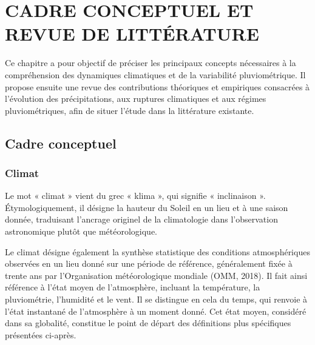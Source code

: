 
\newcommand{\concept}[1]{%
  \par\medskip\noindent
  \professionalbullet\hspace{0.65em}%
  {\color{navyblue}\bfseries #1}%
  \par\nobreak\smallskip
}

\chapter{CADRE CONCEPTUEL ET REVUE DE LITTÉRATURE}

\begin{chapterintro}
\begin{justify}
Ce chapitre a pour objectif de préciser les principaux concepts nécessaires à la compréhension des dynamiques climatiques et de la variabilité pluviométrique. Il propose ensuite une revue des contributions théoriques et empiriques consacrées à l'évolution des précipitations, aux ruptures climatiques et aux régimes pluviométriques, afin de situer l'étude dans la littérature existante.
\end{justify}
\end{chapterintro}

\vspace{0.45cm}
\noindent{\color{navyblue}\rule{\textwidth}{1.1pt}}
\vspace{0.35cm}

\section{Cadre conceptuel}

\subsection{Climat}

Le mot « climat » vient du grec « klima », qui signifie « inclinaison ». Étymologiquement, il désigne la hauteur du Soleil en un lieu et à une saison donnée, traduisant l'ancrage originel de la climatologie dans l'observation astronomique plutôt que météorologique.

Le climat désigne également la synthèse statistique des conditions atmosphériques observées en un lieu donné sur une période de référence, généralement fixée à trente ans par l’Organisation météorologique mondiale (OMM, 2018). Il fait ainsi référence à l'état moyen de l'atmosphère, incluant la température, la pluviométrie, l'humidité et le vent. Il se distingue en cela du temps, qui renvoie à l'état instantané de l'atmosphère à un moment donné. Cet état moyen, considéré dans sa globalité, constitue le point de départ des définitions plus spécifiques présentées ci-après.

